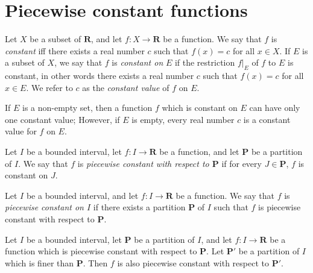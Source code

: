 \section{Piecewise constant functions}\label{sec 11.2}

\begin{definition}\label{11.2.1}
    Let \(X\) be a subset of \(\mathbf{R}\), and let \(f : X \to \mathbf{R}\) be a function.
    We say that \(f\) is \emph{constant} iff there exists a real number \(c\) such that \(f(x) = c\) for all \(x \in X\).
    If \(E\) is a subset of \(X\), we say that \(f\) is \emph{constant on} \(E\) if the restriction \(f|_E\) of \(f\) to \(E\) is constant, in other words there exists a real number \(c\) such that \(f(x) = c\) for all \(x \in E\).
    We refer to \(c\) as the \emph{constant value} of \(f\) on \(E\).
\end{definition}

\begin{remark}\label{11.2.2}
    If \(E\) is a non-empty set, then a function \(f\) which is constant on \(E\) can have only one constant value;
    However, if \(E\) is empty, every real number \(c\) is a constant value for \(f\) on \(E\).
\end{remark}

\begin{definition}\label{11.2.3}
    Let \(I\) be a bounded interval, let \(f : I \to \mathbf{R}\) be a function, and let \(\mathbf{P}\) be a partition of \(I\).
    We say that \(f\) is \emph{piecewise constant with respect to \(\mathbf{P}\)} if for every \(J \in \mathbf{P}\), \(f\) is constant on \(J\).
\end{definition}

\setcounter{theorem}{4}
\begin{definition}\label{11.2.5}
    Let \(I\) be a bounded interval, and let \(f : I \to \mathbf{R}\) be a function.
    We say that \(f\) is \emph{piecewise constant on \(I\)} if there exists a partition \(\mathbf{P}\) of \(I\) such that \(f\) is piecewise constant with respect to \(\mathbf{P}\).
\end{definition}

\setcounter{theorem}{6}
\begin{lemma}\label{11.2.7}
    Let \(I\) be a bounded interval, let \(\mathbf{P}\) be a partition of \(I\), and let \(f : I \to \mathbf{R}\) be a function which is piecewise constant with respect to \(\mathbf{P}\).
    Let \(\mathbf{P}'\) be a partition of \(I\) which is finer than \(\mathbf{P}\).
    Then \(f\) is also piecewise constant with respect to \(\mathbf{P}'\).
\end{lemma}

